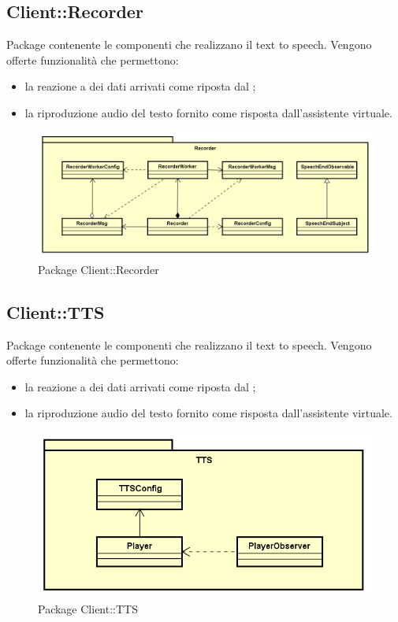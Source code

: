 \subsection{Client::Recorder}
Package contenente le componenti che realizzano il text to speech. Vengono offerte funzionalità che permettono: \begin{itemize} \item la reazione a dei dati arrivati come riposta dal ; \item la riproduzione audio del testo fornito come risposta dall'assistente virtuale. \end{itemize}
\begin{figure}[h] \centering \includegraphics[width=\textwidth,height=\textheight,keepaspectratio]{images/diagrams/client/Client/Recorder.png}
	\caption{Package Client::Recorder}
\end{figure}
\newpage


\subsection{Client::TTS}
Package contenente le componenti che realizzano il text to speech. Vengono offerte funzionalità che permettono: \begin{itemize} \item la reazione a dei dati arrivati come riposta dal ; \item la riproduzione audio del testo fornito come risposta dall'assistente virtuale. \end{itemize}
\begin{figure}[h] \centering \includegraphics[width=\textwidth,height=\textheight,keepaspectratio]{images/diagrams/client/Client/TTS.png}
	\caption{Package Client::TTS}
\end{figure}
\newpage


